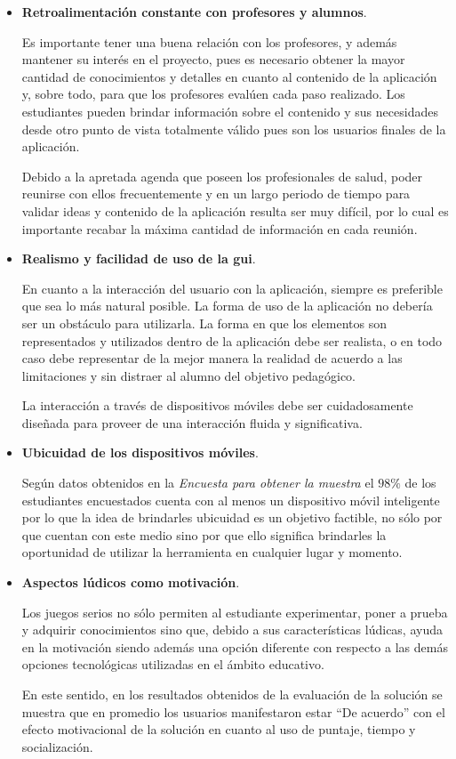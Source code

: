 \begin{itemize}
\item \textbf{Retroalimentación constante con profesores y alumnos}.

Es importante tener una buena relación con los profesores, y además mantener 
su interés en el proyecto, pues es necesario obtener la mayor cantidad de 
conocimientos y detalles en cuanto al contenido de la aplicación y, sobre 
todo, para que los profesores evalúen cada paso realizado. Los estudiantes 
pueden brindar información sobre el contenido y sus necesidades desde otro 
punto de vista totalmente válido pues son los usuarios finales de la 
aplicación.

Debido a la apretada agenda que poseen los profesionales de salud, poder
reunirse con ellos frecuentemente y en un largo periodo de tiempo para validar
ideas y contenido de la aplicación resulta ser muy difícil, por lo cual es
importante recabar la máxima cantidad de información en cada reunión.	
	
	
\item \textbf{Realismo y facilidad de uso de la \Gls{gui}}.

En cuanto a la interacción del usuario con la aplicación, siempre es 
preferible que sea lo más natural posible. La forma de uso de la aplicación no 
debería ser un obstáculo para utilizarla. La forma en que los elementos son 
representados y utilizados dentro de la aplicación debe ser realista, o en 
todo caso debe representar de la mejor manera la realidad de acuerdo a las 
limitaciones y sin distraer al alumno del objetivo pedagógico.

La interacción a través de dispositivos móviles debe ser cuidadosamente 
diseñada para proveer de una interacción fluida y significativa.


\item \textbf{Ubicuidad de los dispositivos móviles}.

Según datos obtenidos en la \emph{Encuesta para obtener la muestra} el $98\%$ 
de los estudiantes encuestados cuenta con al menos un dispositivo móvil 
inteligente por lo que la idea de brindarles ubicuidad es un objetivo 
factible, no sólo por que cuentan con este medio sino por que ello 
significa brindarles la oportunidad de utilizar la herramienta en cualquier 
lugar y momento.


\item \textbf{Aspectos lúdicos como motivación}.

Los juegos serios no sólo permiten al estudiante experimentar, poner a prueba 
y adquirir conocimientos sino que, debido a sus características lúdicas, ayuda 
en la motivación siendo además una opción diferente con respecto a las demás
opciones tecnológicas utilizadas en el ámbito educativo.
    
En este sentido, en los resultados obtenidos de la evaluación de la solución 
se muestra que en promedio los usuarios manifestaron estar \enquote{De 
acuerdo} con el efecto motivacional de la solución en cuanto al uso de 
puntaje, tiempo y socialización.

\end{itemize}


